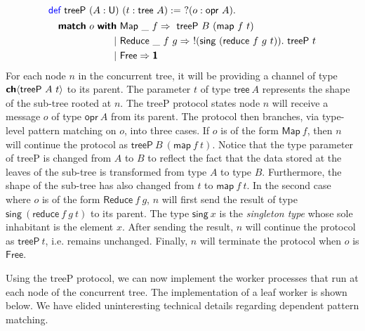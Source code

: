 \vspace{-1em}
\begingroup
\small
\addtolength{\jot}{-0.25em}
\begin{alignat*}{4}
  &\Def\ \textsf{treeP}\ (A : \Un)\ (t : \textsf{tree}\ A) :=\ ?(o : \textsf{opr}\ A).\\
  &\quad
    \begin{alignedat}{4}
      \Match\ o\ \With&\ \textsf{Map}\ \_\ f \Rightarrow\ \textsf{treeP}\ B\ (\textsf{map}\ f\ t) \\
                  \mid&\ \textsf{Reduce}\ \_\ f\ g \Rightarrow\ !(\textsf{sing}\ (\textsf{reduce}\ f\ g\ t)).\ \textsf{treeP}\ t \\
                  \mid&\ \textsf{Free} \Rightarrow \End
    \end{alignedat}
\end{alignat*}
\endgroup
For each node $n$ in the concurrent tree, it will be providing a channel of type
${\textbf{\textsf{ch}}\langle{\textsf{treeP}\ A\ t}\rangle}$ to its parent. The parameter $t$ of type
$\textsf{tree}\ A$ represents the shape of the sub-tree rooted at $n$. The
\textsf{treeP} protocol states node $n$ will receive a message $o$ of type
$\textsf{opr}\ A$ from its parent.  The protocol then branches, via type-level
pattern matching on $o$, into three cases. If $o$ is of the form
$\textsf{Map}\ f$, then $n$ will continue the protocol as
$\textsf{treeP}\ B\ (\textsf{map}\ f\ t)$. Notice that the type parameter of
\textsf{treeP} is changed from $A$ to $B$ to reflect the fact that the data
stored at the leaves of the sub-tree is transformed from type $A$ to type
$B$. Furthermore, the shape of the sub-tree has also changed from $t$ to
$\textsf{map}\ f\ t$. In the second case where $o$ is of the form
$\textsf{Reduce}\ f\ g$, $n$ will first send the result of type
$\textsf{sing}\ (\textsf{reduce}\ f\ g\ t)$ to its parent. The type
$\textsf{sing}\ x$ is the \emph{singleton type} whose sole inhabitant is the
element $x$. After sending the result, $n$ will continue the protocol as
$\textsf{treeP}\ t$, i.e. remains unchanged. Finally, $n$ will terminate
the protocol when $o$ is $\textsf{Free}$.

Using the \textsf{treeP} protocol, we can now implement the worker processes
that run at each node of the concurrent tree. The implementation of a leaf worker
is shown below. We have elided uninteresting technical details regarding dependent
pattern matching.

